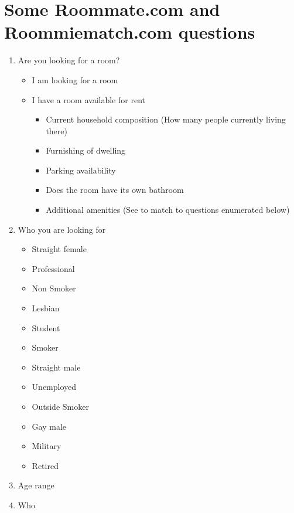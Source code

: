 \documentclass[journal]{./IEEE/IEEEtran}
\begin{document}
\newpage
% 



\newpage
\appendices
\section{Some Roommate.com and Roommiematch.com questions} %
\begin{enumerate}
    \item Are you looking for a room?
    \begin{itemize}
        \item I am looking for a room
        \item I have a room available for rent
        \begin{itemize}
            \item Current household composition (How many people currently living there)
            \item Furnishing of dwelling
            \item Parking availability
            \item Does the room have its own bathroom
            \item Additional amenities (See to match to questions enumerated below)
        \end{itemize}
    \end{itemize}
    \item Who you are looking for
    \begin{itemize}
        \item Straight female
        \item Professional
        \item Non Smoker
        \item Lesbian
        \item Student
        \item Smoker
        \item Straight male
        \item Unemployed
        \item Outside Smoker
        \item Gay male
        \item Military
        \item Retired
    \end{itemize}
    \item Age range
    \item Who

\end{enumerate}
\end{document}
